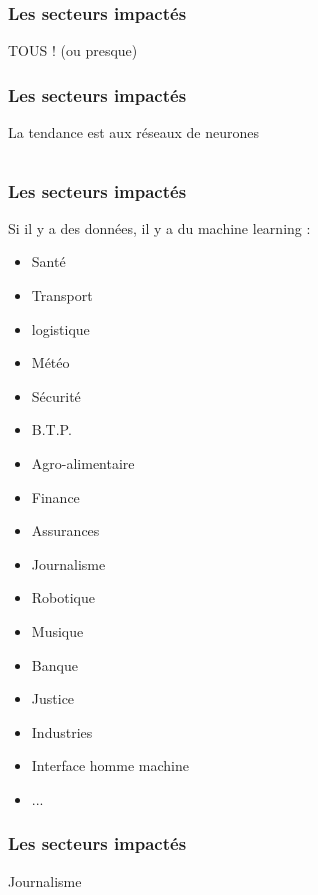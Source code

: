 \begin{frame}
  \frametitle{Les secteurs impactés}
  \begin{center}
    \huge TOUS ! (ou presque)
  \end{center}
\end{frame}

\begin{frame}
  \frametitle{Les secteurs impactés}
  \begin{center}
    La tendance est aux réseaux de neurones
  \end{center}
  $\;$ \\
  \begin{minipage}[c]{0.49\linewidth}
  \end{minipage}\hfill
  \begin{minipage}[c]{0.49\linewidth}
  \end{minipage}\hfill
\end{frame}

\begin{frame}
  \frametitle{Les secteurs impactés}
  Si il y a des données, il y a du machine learning :
  \newline
  \newline
  \begin{minipage}[c]{0.49\linewidth}
    \begin{itemize}
    \item Santé 
    \item Transport
    \item logistique
    \item Météo
    \item Sécurité
    \item B.T.P.
    \item Agro-alimentaire    
    \item Finance
    \item Assurances
    \end{itemize}
  \end{minipage}\hfill
  \begin{minipage}[c]{0.49\linewidth}
    \begin{itemize}
    \item Journalisme
    \item Robotique
    \item Musique
    \item Banque
    \item Justice
    \item Industries
    \item Interface homme machine
    \item ...
    \end{itemize}
  \end{minipage}\hfill
\end{frame}

\begin{frame}
  \frametitle{Les secteurs impactés}
  Journalisme
\end{frame}
